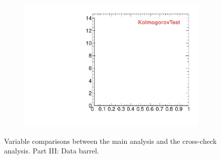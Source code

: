 \begin{figure}
\begin{subfigure}[b]{0.2\textwidth}
                \includegraphics[width=\textwidth]{Figures/VariablesComparison/Data_barrel_figs/KS}
                \label{fig:Data_barrel_KS}
        \end{subfigure}
        \caption{Variable comparisons between the main analysis and the cross-check analysis. Part III: Data barrel.}
        \label{fig:Data_barrel_figs}
\end{figure}


